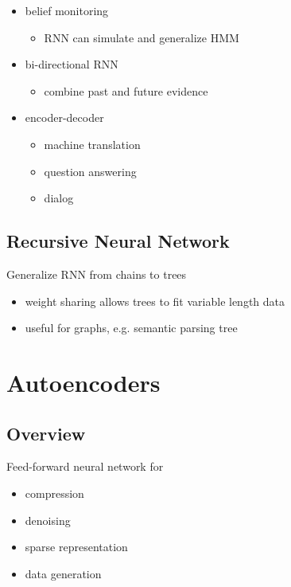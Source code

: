 \documentclass[]{article}
\theoremstyle{definition}
\begin{document}
\begin{itemize}
    \item belief monitoring
        \begin{itemize}
            \item RNN can simulate and generalize HMM
        \end{itemize}
    \item bi-directional RNN
        \begin{itemize}
            \item combine past and future evidence
        \end{itemize}
    \item encoder-decoder
        \begin{itemize}
            \item machine translation
            \item question answering
            \item dialog
        \end{itemize}
\end{itemize}

\subsection{Recursive Neural Network}
\label{sub:recursive_neural_network}

Generalize RNN from chains to trees
\begin{itemize}
    \item weight sharing allows trees to fit variable length data
    \item useful for graphs, e.g. semantic parsing tree
\end{itemize}


\section{Autoencoders}
\label{sec:autoencoders}


\subsection{Overview}
Feed-forward neural network for 
\begin{itemize}
    \item compression
    \item denoising
    \item sparse representation
    \item data generation
\end{itemize}
\end{document}
